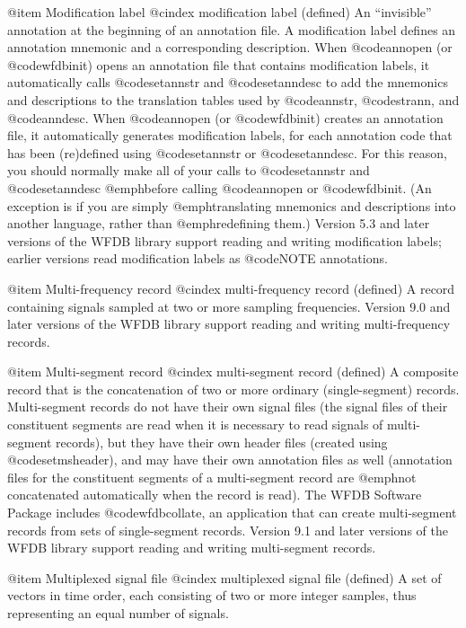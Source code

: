 {{{{{{{{{@item Modification label
@cindex modification label (defined)
An ``invisible'' annotation at the beginning of an annotation file.  A
modification label defines an annotation mnemonic and a corresponding
description.  When @code{annopen} (or @code{wfdbinit}) opens an annotation
file that contains modification labels, it automatically calls
@code{setannstr} and @code{setanndesc} to add the mnemonics and
descriptions to the translation tables used by @code{annstr},
@code{strann}, and @code{anndesc}.  When @code{annopen} (or
@code{wfdbinit}) creates an annotation file, it automatically generates
modification labels, for each annotation code that has been (re)defined
using @code{setannstr} or @code{setanndesc}.  For this reason, you
should normally make all of your calls to @code{setannstr} and
@code{setanndesc} @emph{before} calling @code{annopen} or @code{wfdbinit}.
(An exception is if you are simply @emph{translating} mnemonics and
descriptions into another language, rather than @emph{redefining} them.)
Version 5.3 and later versions of the WFDB library support reading and
writing modification labels;  earlier versions read modification labels
as @code{NOTE} annotations.

@item Multi-frequency record
@cindex multi-frequency record (defined)
A record containing signals sampled at two or more sampling frequencies.
Version 9.0 and later versions of the WFDB library support reading and
writing multi-frequency records.

@item Multi-segment record
@cindex multi-segment record (defined)
A composite record that is the concatenation of two or more ordinary
(single-segment) records.  Multi-segment records do not have their own
signal files (the signal files of their constituent segments are read
when it is necessary to read signals of multi-segment records), but they
have their own header files (created using @code{setmsheader}),
and may have their own annotation files as well (annotation files for
the constituent segments of a multi-segment record are @emph{not}
concatenated automatically when the record is read).  The WFDB Software
Package includes @code{wfdbcollate}, an
application that can create multi-segment records from sets of
single-segment records.  Version 9.1 and later versions of the WFDB
library support reading and writing multi-segment records.

@item Multiplexed signal file
@cindex multiplexed signal file (defined)
A set of vectors in time order, each consisting of two or more integer
samples, thus representing an equal number of signals.

}}}}}}}}}

